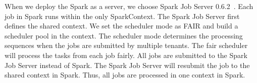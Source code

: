 
When we deploy the Spark as a server, we choose Spark Job Server 0.6.2~\cite{www:jobserver}. Each job in Spark runs within the only {\ttfamily \small SparkContext}. The Spark Job Server first defines the shared context. We set the scheduler mode as FAIR and build a scheduler pool in the context. The scheduler mode determines the processing sequences when the jobs are submitted by multiple tenants. The fair scheduler will process the tasks from each job fairly. All jobs are submitted to the Spark Job Server instead of Spark. The Spark Job Server will resubmit the job to the shared context in Spark. Thus, all jobs are processed in one context in Spark.